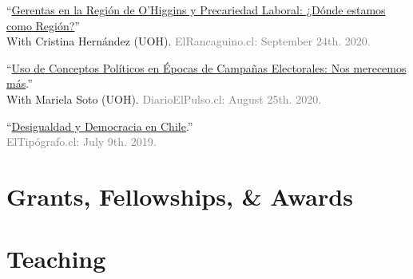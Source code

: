 \documentclass[letterpaper]{article}
\renewenvironment{itemize}{
  \begin{list}{}{
    \setlength{\leftmargin}{1.5em}
  }
}{
  \end{list}
}
\begin{document}
\begin{itemize}
    \item[\textcolor{gray}{\textbullet}] ``\href{https://www.elrancaguino.cl/2020/09/24/gerentas-en-la-region-de-ohiggins-y-precariedad-laboral-donde-estamos-como-region/}{Gerentas en la Regi\'on de O'Higgins y Precariedad Laboral: ¿D\'onde estamos como Regi\'on?}''\\With Cristina Hern\'andez (UOH). \textcolor{gray}{ElRancaguino.cl: September 24th. 2020.}
   
    \item[\textcolor{gray}{\textbullet}] ``\href{https://www.diarioelpulso.cl/2020/08/25/uso-de-conceptos-politicos-en-epocas-de-campanas-electorales-nos-merecemos-mas/}{Uso de Conceptos Pol\'iticos en \'Epocas de Campa\~nas Electorales: Nos merecemos m\'as}.''\\With Mariela Soto (UOH). \textcolor{gray}{DiarioElPulso.cl: August 25th. 2020.}
   
    \item[\textcolor{gray}{\textbullet}] ``\href{https://eltipografo.cl/2019/07/desigualdad-y-democracia-en-chile}{Desigualdad y Democracia en Chile}.''\\\textcolor{gray}{ElTip\'ografo.cl: July 9th. 2019.}


  \end{itemize}

\section*{Grants, Fellowships, \& Awards}
{\unskip}



\section*{Teaching}

{\unskip}

\end{document}

